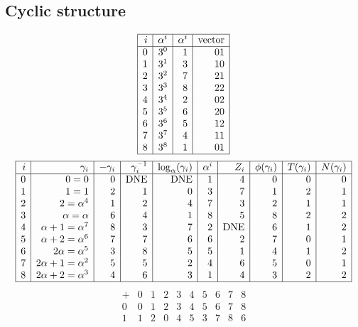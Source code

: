 \documentclass[12pt]{article}
\begin{document}
{\subsection*{Cyclic structure}
$$
\begin{array}{|r|r|r|r|}
\hline
i & \alpha^i & \alpha^i & \mbox{vector}\\
\hline
0 & 3^{0} & 1 & 01\\
1 & 3^{1} & 3 & 10\\
2 & 3^{2} & 7 & 21\\
3 & 3^{3} & 8 & 22\\
4 & 3^{4} & 2 & 02\\
5 & 3^{5} & 6 & 20\\
6 & 3^{6} & 5 & 12\\
7 & 3^{7} & 4 & 11\\
8 & 3^{8} & 1 & 01\\
\hline
\end{array}
$$
$$
\begin{array}{|*{10}{r|}}
\hline
i & \gamma_i & -\gamma_i& \gamma_i^{-1}& \log_\alpha(\gamma_i)& \alpha^i& Z_i& \phi(\gamma_i) & T(\gamma_i) & N(\gamma_i) \\
\hline
  0 & 0 = 0 &0 & \mbox{DNE} & \mbox{DNE} &1 &4 &0 &0 &0\\
  1 &   1 = 1 &2 &1 &0 &3 &7 &1 &2 &1\\
  2 &   2 = \alpha^{4} &1 &2 &4 &7 &3 &2 &1 &1\\
  3 & \alpha = \alpha  &6 &4 &1 &8 &5 &8 &2 &2\\
  4 & \alpha +   1 = \alpha^{7} &8 &3 &7 &2 & \mbox{DNE} &6 &1 &2\\
  5 & \alpha +   2 = \alpha^{6} &7 &7 &6 &6 &2 &7 &0 &1\\
  6 &   2\alpha = \alpha^{5} &3 &8 &5 &5 &1 &4 &1 &2\\
  7 &   2\alpha +   1 = \alpha^{2} &5 &5 &2 &4 &6 &5 &0 &1\\
  8 &   2\alpha +   2 = \alpha^{3} &4 &6 &3 &1 &4 &3 &2 &2\\
\hline
\end{array}
$$
$$
\begin{array}{|r|*{9}{r}|}
\hline
+  &         0 &         1 &         2 &         3 &         4 &         5 &         6 &         7 &         8\\
\hline
         0&         0&         1&         2&         3&         4&         5&         6&         7&         8\\
         1&         1&         2&         0&         4&         5&         3&         7&         8&         6\\

\end{array}$$}
\end{document}
